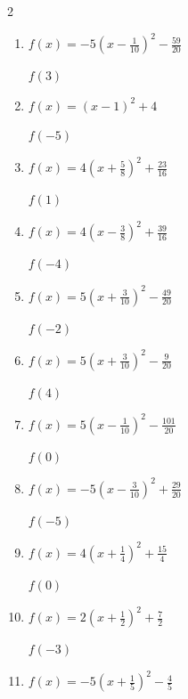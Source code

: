 \begin{multicols}{2}
\begin{enumerate}
$f(0)$
        \phantom{$=0$}

\columnbreak %

  \item $\displaystyle f(x)=-5\left( x-\frac{1}{10}\right)^{2}-\frac{59}{20}$

$f(3)$
        \phantom{$=-45$}

  \item $\displaystyle f(x)=\left( x-1\right)^{2}+4$

$f(-5)$
        \phantom{$=40$}

  \item $\displaystyle f(x)=4\left( x+\frac{5}{8}\right)^{2}+\frac{23}{16}$

$f(1)$
        \phantom{$=12$}

  \item $\displaystyle f(x)=4\left( x-\frac{3}{8}\right)^{2}+\frac{39}{16}$

$f(-4)$
        \phantom{$=79$}

  \item $\displaystyle f(x)=5\left( x+\frac{3}{10}\right)^{2}-\frac{49}{20}$

$f(-2)$
        \phantom{$=12$}

\columnbreak %

\resetques

  \item $\displaystyle f(x)=5\left( x+\frac{3}{10}\right)^{2}-\frac{9}{20}$

$f(4)$
        \phantom{$=92$}

  \item $\displaystyle f(x)=5\left( x-\frac{1}{10}\right)^{2}-\frac{101}{20}$

$f(0)$
        \phantom{$=-5$}

  \item $\displaystyle f(x)=-5\left( x-\frac{3}{10}\right)^{2}+\frac{29}{20}$

$f(-5)$
        \phantom{$=-139$}

  \item $\displaystyle f(x)=4\left( x+\frac{1}{4}\right)^{2}+\frac{15}{4}$

$f(0)$
        \phantom{$=4$}

  \item $\displaystyle f(x)=2\left( x+\frac{1}{2}\right)^{2}+\frac{7}{2}$

$f(-3)$
        \phantom{$=16$}

\columnbreak %

  \item $\displaystyle f(x)=-5\left( x+\frac{1}{5}\right)^{2}-\frac{4}{5}$


\end{enumerate}
\end{multicols}

